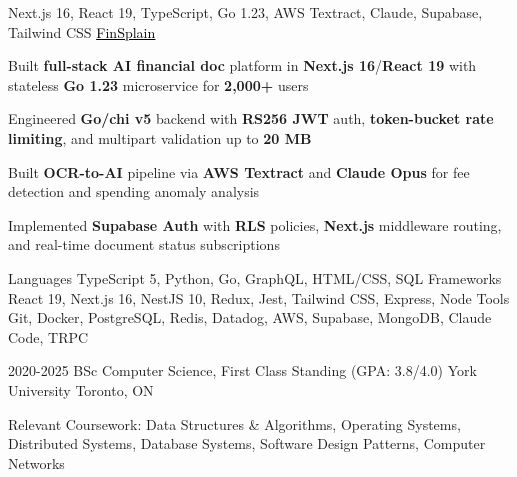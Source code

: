 \documentclass[11pt, a4paper]{awesome-cv}
\begin{document}

\begin{cventries}
  \cventry
  {Next.js 16, React 19, TypeScript, Go 1.23, AWS Textract, Claude, Supabase, Tailwind CSS}
  {\href{https://finsplain.net}{\textcolor{black}{\underline{FinSplain}} \faExternalLink}}
  {}
  {}
  {
    \begin{cvitems}
      \item {Built \textbf{full-stack AI financial doc} platform in \textbf{Next.js 16}/\textbf{React 19} with stateless \textbf{Go 1.23} microservice for \textbf{2,000+} users}
      \item {Engineered \textbf{Go/chi v5} backend with \textbf{RS256 JWT} auth, \textbf{token-bucket rate limiting}, and multipart validation up to \textbf{20 MB}}
      \item {Built \textbf{OCR-to-AI} pipeline via \textbf{AWS Textract} and \textbf{Claude Opus} for fee detection and spending anomaly analysis}
      \item {Implemented \textbf{Supabase Auth} with \textbf{RLS} policies, \textbf{Next.js} middleware routing, and real-time document status subscriptions}
    \end{cvitems}
  }
\end{cventries}


\begin{cvskills}
  \cvskill
  {Languages}
  {TypeScript 5, Python, Go, GraphQL, HTML/CSS, SQL}
  \cvskill
  {Frameworks}
  {React 19, Next.js 16, NestJS 10, Redux, Jest, Tailwind CSS, Express, Node}
  \cvskill
  {Tools}
  {Git, Docker, PostgreSQL, Redis, Datadog, AWS, Supabase, MongoDB, Claude Code, TRPC}
\end{cvskills}

\vspace{-2mm}

\begin{cventries}
  \cventry
  {2020-2025}
  {BSc Computer Science, First Class Standing (GPA: 3.8/4.0)}
  {York University}
  {Toronto, ON}
  {%
    \begin{cvitems}
      \item {Relevant Coursework: Data Structures \& Algorithms, Operating Systems, Distributed Systems, Database Systems, Software Design Patterns, Computer Networks}
    \end{cvitems}
    \vspace{-4mm}
  }
\end{cventries}
\end{document}
